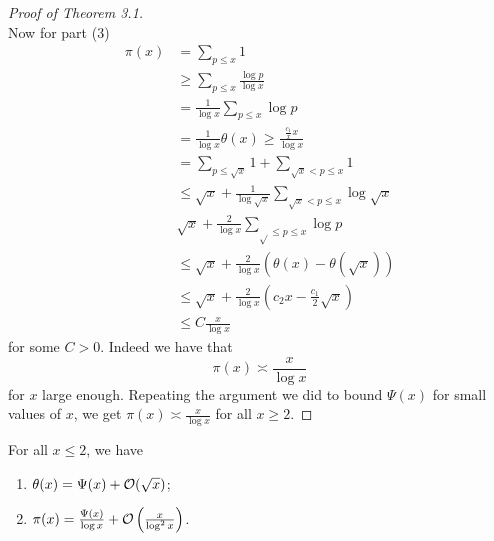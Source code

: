 \documentclass[twoside, openright, fontsize=10pt, headings=big]{scrbook}
\begin{document}
\begin{proof}[Proof of Theorem 3.1]
\\
Now for part (3)
\begin{align*}
    \pi(x)&=\sum_{p\leq x}1\\
    &\geq\sum_{p\leq x}\frac{\log p}{\log x}\\
    &=\frac{1}{\log x}\sum_{p\leq x}\log p\\
    &=\frac{1}{\log x}\theta(x)\geq\frac{\frac{c_1}{x}x}{\log x}\\
    &=\sum_{p\leq\sqrt{x}}1+\sum_{\sqrt{x}<p\leq x}1\\
    &\leq\sqrt{x}+\frac{1}{\log\sqrt{x}}\sum_{\sqrt{x}<p\leq x}\log\sqrt{x}\\
    &\sqrt{x}+\frac{2}{\log x}\sum_{\sqrt{}\leq p\leq x}\log p\\
    &\leq\sqrt{x}+\frac{2}{\log x}(\theta(x)-\theta(\sqrt{x}))\\
    &\leq\sqrt{x}+\frac{2}{\log x}(c_2x-\frac{c_1}{2}\sqrt{x})\\
    &\leq C\frac{x}{\log x}
\end{align*}
for some $C>0$. Indeed we have that 
\[
    \pi(x)\asymp\frac{x}{\log x}
\]
for $x$ large enough. Repeating the argument we did to bound $\Psi(x)$ for small values of $x$, we get $\pi(x)\asymp\frac{x}{\log x}$ for all $x\geq 2$.\qedhere
\end{proof}    
\begin{theorem}{}{}
    For all $x\leq2$, we have 
    \begin{enumerate}
        \item[(1)] $\theta(x)=\Psi(x)+\mathcal{O}(\sqrt{x})$;
        \item[(2)] $\pi(x)=\frac{\Psi(x)}{\log x}+\mathcal{O}\left(\frac{x}{\log^2x}\right)$.
    \end{enumerate}
\end{theorem}
\end{document}
